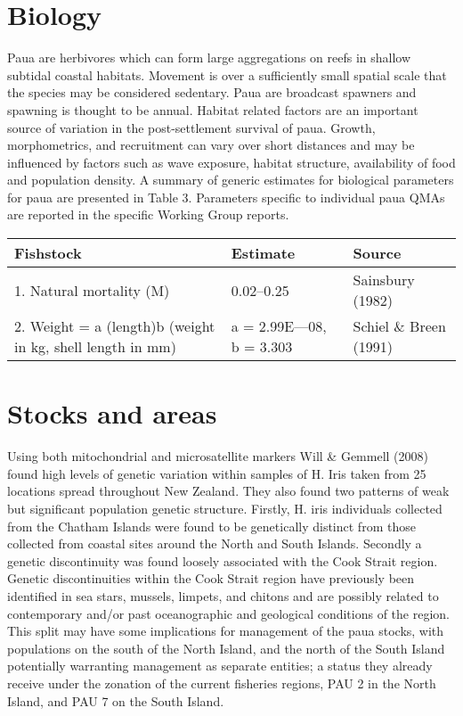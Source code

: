 \documentclass{mpi-plenary}
\theoremstyle{definition}
\theoremstyle{definition}
\theoremstyle{definition}
\theoremstyle{remark}
\begin{document}
\section{Biology}\label{biology}

Paua are herbivores which can form large aggregations on reefs in
shallow subtidal coastal habitats. Movement is over a sufficiently small
spatial scale that the species may be considered sedentary. Paua are
broadcast spawners and spawning is thought to be annual. Habitat related
factors are an important source of variation in the post-settlement
survival of paua. Growth, morphometrics, and recruitment can vary over
short distances and may be influenced by factors such as wave exposure,
habitat structure, availability of food and population density. A
summary of generic estimates for biological parameters for paua are
presented in Table 3. Parameters specific to individual paua QMAs are
reported in the specific Working Group reports.

\begin{tabular}{l|l|l}
\hline
Fishstock & Estimate & Source\\
\hline
1. Natural mortality (M) & 0.02–0.25 & Sainsbury (1982)\\
\hline
2. Weight = a (length)b  (weight in kg, shell length in mm) & a = 2.99E—08, b = 3.303 & Schiel \& Breen (1991)\\
\hline
\end{tabular}

\section{Stocks and areas}\label{stocks-and-areas}

Using both mitochondrial and microsatellite markers Will \& Gemmell
(2008) found high levels of genetic variation within samples of H. Iris
taken from 25 locations spread throughout New Zealand. They also found
two patterns of weak but significant population genetic structure.
Firstly, H. iris individuals collected from the Chatham Islands were
found to be genetically distinct from those collected from coastal sites
around the North and South Islands. Secondly a genetic discontinuity was
found loosely associated with the Cook Strait region. Genetic
discontinuities within the Cook Strait region have previously been
identified in sea stars, mussels, limpets, and chitons and are possibly
related to contemporary and/or past oceanographic and geological
conditions of the region. This split may have some implications for
management of the paua stocks, with populations on the south of the
North Island, and the north of the South Island potentially warranting
management as separate entities; a status they already receive under the
zonation of the current fisheries regions, PAU 2 in the North Island,
and PAU 7 on the South Island.
\end{document}
